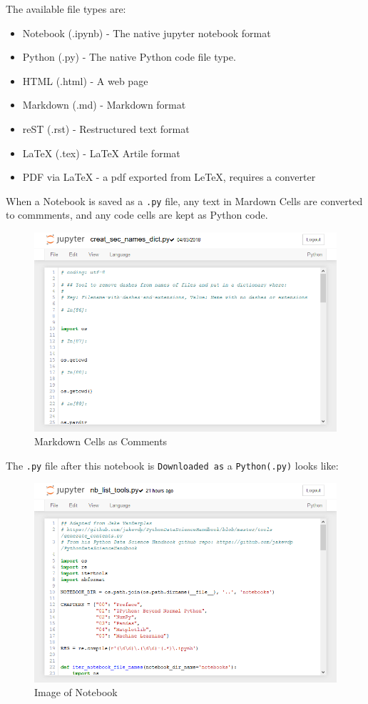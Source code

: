 \documentclass{book}
\makeatletter
\def\maxwidth{\ifdim\Gin@nat@width>\linewidth\linewidth
    \else\Gin@nat@width\fi}
\let\Oldincludegraphics\includegraphics
\renewcommand{\includegraphics}[1]{\Oldincludegraphics[width=.8\maxwidth]{#1}}
\providecommand{\tightlist}{%
      \setlength{\itemsep}{0pt}\setlength{\parskip}{0pt}}
\makeatother
\begin{document}
The available file types are:

\begin{itemize}
\tightlist
\item
  Notebook (.ipynb) - The native jupyter notebook format
\item
  Python (.py) - The native Python code file type.
\item
  HTML (.html) - A web page
\item
  Markdown (.md) - Markdown format
\item
  reST (.rst) - Restructured text format
\item
  LaTeX (.tex) - LaTeX Artile format
\item
  PDF via LaTeX - a pdf exported from LeTeX, requires a converter
\end{itemize}

When a Notebook is saved as a \lstinline!.py! file, any text in Mardown
Cells are converted to commments, and any code cells are kept as Python
code.

\begin{figure}
\centering
\includegraphics{images/jupyter_notebook_markdown_cells_as_comments.png}
\caption{Markdown Cells as Comments}
\end{figure}

The \lstinline!.py! file after this notebook is
\lstinline!Downloaded as! a \lstinline!Python(.py)! looks like:

\begin{figure}
\centering
\includegraphics{images/jupyter_notebook_dot_py_file.png}
\caption{Image of Notebook}
\end{figure}
\end{document}
